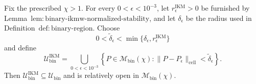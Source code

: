 Fix the prescribed \(\chi>1\). For every \(0<\epsilon<10^{-3}\), let \(r_\epsilon^{\mathrm{IKM}}>0\) be furnished by Lemma~\(\mathrm{lem{:}binary\text{-}ikmw\text{-}normalized\text{-}stability}\), and let \(\delta_\epsilon\) be the radius used in Definition~\(\mathrm{def{:}binary\text{-}region}\). Choose
\[
 0<\widetilde\delta_\epsilon
 <\min\{\delta_\epsilon,r_\epsilon^{\mathrm{IKM}}\}
\]
and define
\[
 \mathcal U_{\mathrm{bin}}^{\mathrm{IKM}}
 =\bigcup_{0<\epsilon<10^{-3}}
 \left\{P\in\mathcal M_{\mathrm{bin}}(\chi):
 \|P-P_\epsilon\|_{\mathrm{cell}}<\widetilde\delta_\epsilon\right\}. \tag{1}
\]
Then \(\mathcal U_{\mathrm{bin}}^{\mathrm{IKM}}\subseteq\mathcal U_{\mathrm{bin}}\) and is relatively open in \(\mathcal M_{\mathrm{bin}}(\chi)\).